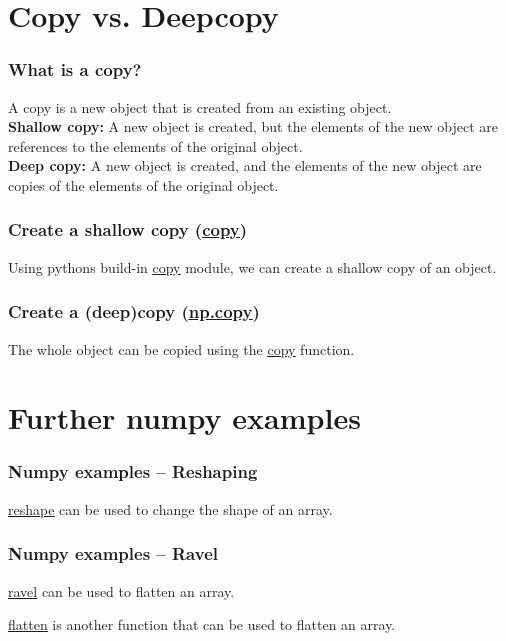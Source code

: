 \documentclass{beamer}
\newcommand{\hrefu}[2]{\underline{\href{#1}{#2}}}
\begin{document}
\section{Copy vs. Deepcopy}
\begin{frame}
  \frametitle{What is a copy?}
  A copy is a new object that is created from an existing object.\\
  \vspace{5mm}
  \textbf{Shallow copy:} A new object is created, but the elements of the new object are references to the elements of the original object.\\
  \vspace{5mm}
  \textbf{Deep copy:} A new object is created, and the elements of the new object are copies of the elements of the original object.
\end{frame}
\begin{frame}
  \frametitle{Create a shallow copy (\hrefu{https://docs.python.org/3/library/copy.html}{copy})}
  Using pythons build-in \hrefu{https://docs.python.org/3/library/copy.html}{copy} module, we can create a shallow copy of an object.\\
  
\end{frame}
\begin{frame}
  \frametitle{Create a (deep)copy (\hrefu{https://numpy.org/doc/stable/reference/generated/numpy.copy.html}{np.copy})}
  The whole object can be copied using the \hrefu{https://numpy.org/doc/stable/reference/generated/numpy.copy.html}{copy} function.\\
  
  

\end{frame}
\section{Further numpy examples}
\begin{frame}
  \frametitle{Numpy examples -- Reshaping}
  \hrefu{https://numpy.org/doc/stable/reference/generated/numpy.reshape.html}{reshape} can be used to change the shape of an array.
  
\end{frame}
\begin{frame}
  \frametitle{Numpy examples -- Ravel}
  \hrefu{https://numpy.org/doc/stable/reference/generated/numpy.ravel.html}{ravel} can be used to flatten an array.
  
  \hrefu{https://numpy.org/doc/stable/reference/generated/numpy.ndarray.flatten.html}{flatten} is another function that can be used to flatten an array.
\end{frame}


\end{document}
